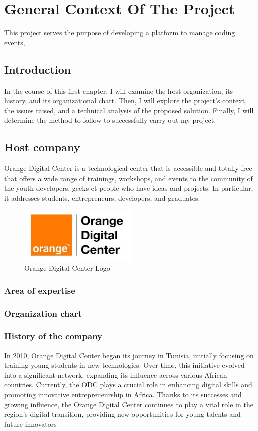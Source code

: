 \chapter{General Context Of The Project}
This project serves the purpose of developing a platform to manage coding
events,

\section{Introduction}
In the course of this first chapter, I will examine the host organization, its
history, and its organizational chart. Then, I will explore the project's
context, the issues raised, and a technical analysis of the proposed solution.
Finally, I will determine the method to follow to successfully carry out my
project.

\section{Host company}
Orange Digital Center\cite{OrangeDigitalCenter} is a technological center that
is accessible and totally
free
that offers a wide range of trainings, workshops, and events to the community
of the
youth developers, geeks et people who have ideas and projects. In particular,
it addresses
students, entrepreneurs, developers, and graduates.

\begin{figure}[h]
      \centering
      \includegraphics[width=0.5\textwidth]{../images/odc.png}
      \caption{Orange Digital Center Logo}
      \label{fig:Orange Digital Center Logo}
\end{figure}

\subsection{Area of expertise}

\subsection{Organization chart}

\subsection{History of the company}
In 2010, Orange Digital Center began its journey in Tunisia, initially focusing
on training young students in new technologies. Over time, this initiative
evolved into a significant network, expanding its influence across various
African countries. Currently, the ODC plays a crucial role in enhancing digital
skills and promoting innovative entrepreneurship in Africa. Thanks to its
successes and growing influence, the Orange Digital Center continues to play a
vital role in the region's digital transition, providing new opportunities for
young talents and future innovators
